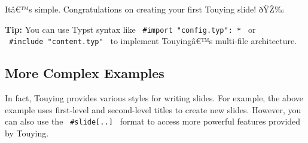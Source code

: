 
Itâ€™s simple. Congratulations on creating your first Touying slide!
ðŸŽ‰

\textbf{Tip:} You can use Typst syntax like
\texttt{\ \#import\ "config.typ":\ *\ } or
\texttt{\ \#include\ "content.typ"\ } to implement Touyingâ€™s
multi-file architecture.

\subsection{More Complex Examples}\label{more-complex-examples}

In fact, Touying provides various styles for writing slides. For
example, the above example uses first-level and second-level titles to
create new slides. However, you can also use the
\texttt{\ \#slide{[}..{]}\ } format to access more powerful features
provided by Touying.

